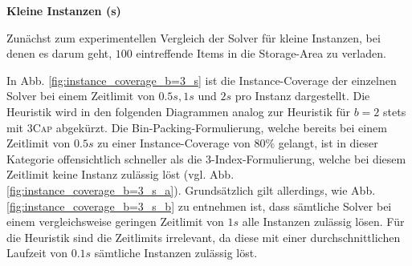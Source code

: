 \textbf{Kleine Instanzen (s)}

Zunächst zum experimentellen Vergleich der Solver für kleine Instanzen, bei denen es darum geht,
$100$ eintreffende Items in die Storage-Area zu verladen.

In Abb. \ref{fig:instance_coverage_b=3_s} ist die Instance-Coverage der einzelnen Solver bei einem Zeitlimit von $0.5s, 1s$ und $2s$ pro Instanz dargestellt. Die Heuristik wird in den folgenden Diagrammen analog zur Heuristik für $b = 2$ stets mit \textsc{3Cap} abgekürzt. Die Bin-Packing-Formulierung, welche bereits bei einem Zeitlimit von $0.5s$ zu einer Instance-Coverage von $80 \%$ gelangt, ist in dieser Kategorie offensichtlich schneller als die 3-Index-Formulierung, welche bei diesem Zeitlimit keine Instanz zulässig löst (vgl. Abb. \ref{fig:instance_coverage_b=3_s_a}).
Grundsätzlich gilt allerdings, wie Abb. \ref{fig:instance_coverage_b=3_s_b} zu entnehmen ist, dass sämtliche Solver
bei einem vergleichsweise geringen Zeitlimit von $1s$ alle Instanzen zulässig lösen.
Für die Heuristik sind die Zeitlimits irrelevant, da diese mit einer durchschnittlichen Laufzeit
von $0.1s$ sämtliche Instanzen zulässig löst.

